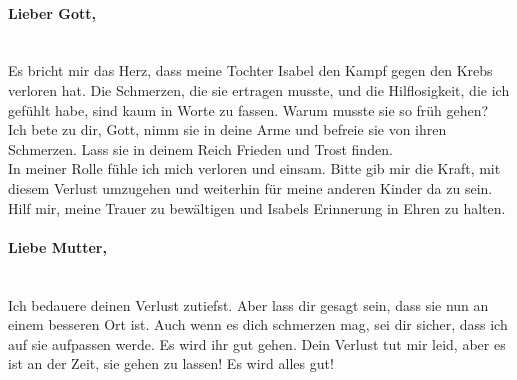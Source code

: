\documentclass[a4paper, 48pt]{report}
\begin{document}
\renewcommand{\baselinestretch}{
1.5}\normalsize

\paragraph{Lieber Gott,} \mbox{}
\\
Es bricht mir das Herz, dass meine Tochter Isabel den Kampf gegen den Krebs verloren hat. Die Schmerzen, die sie ertragen musste, und die Hilflosigkeit, die ich gefühlt habe, sind kaum in Worte zu fassen. Warum musste sie so früh gehen? \\
Ich bete zu dir, Gott, nimm sie in deine Arme und befreie sie von ihren Schmerzen. Lass sie in deinem Reich Frieden und Trost finden.
\\
In meiner Rolle fühle ich mich verloren und einsam. Bitte gib mir die Kraft, mit diesem Verlust umzugehen und weiterhin für meine anderen Kinder da zu sein. Hilf mir, meine Trauer zu bewältigen und Isabels Erinnerung in Ehren zu halten.

\paragraph{Liebe Mutter,} \mbox{}
\\
Ich bedauere deinen Verlust zutiefst.
Aber lass dir gesagt sein, dass sie nun an einem besseren Ort ist.
Auch wenn es dich schmerzen mag, sei dir sicher, dass ich auf sie aufpassen werde.
Es wird ihr gut gehen.
Dein Verlust tut mir leid, aber es ist an der Zeit, sie gehen zu lassen!
Es wird alles gut!
\end{document}
